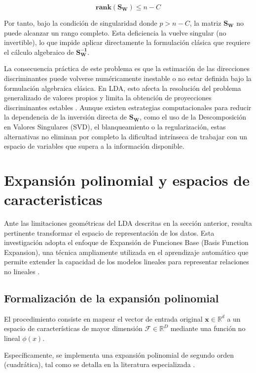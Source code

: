 \begin{equation}
	\mathbf{rank(S_W)}\leq n-C
	\label{eq:EMT11}
\end{equation}

Por tanto, bajo la condición de singularidad donde $p>n-C$, la matriz $\mathbf{S_W}$ no puede alcanzar un rango completo. Esta deficiencia la vuelve singular (no invertible), lo que impide aplicar directamente la formulación clásica que requiere el cálculo algebraico de $\mathbf{S_W^{-1}}$.

La consecuencia práctica de este problema es que la estimación de las direcciones discriminantes puede volverse numéricamente inestable o no estar definida bajo la formulación algebraica clásica. En LDA, esto afecta la resolución del problema generalizado de valores propios y limita la obtención de proyecciones discriminantes estables \cite{gao2006direct} \cite{martinez2001pca}. Aunque existen estrategias computacionales para reducir la dependencia de la inversión directa de $\mathbf{S_W}$, como el uso de la Descomposición en Valores Singulares (SVD), el blanqueamiento o la regularización, estas alternativas no eliminan por completo la dificultad intrínseca de trabajar con un espacio de variables que supera a la información disponible.

\section{Expansión polinomial y espacios de caracteristicas}

Ante las limitaciones geométricas del LDA descritas en la sección anterior, resulta pertinente transformar el espacio de representación de los datos. Esta investigación adopta el enfoque de Expansión de Funciones Base (Basis Function Expansion), una técnica ampliamente utilizada en el aprendizaje automático que permite extender la capacidad de los modelos lineales para representar relaciones no lineales \cite{bishop2006pattern}.

\subsection{Formalización de la expansión polinomial}

El procedimiento consiste en mapear el vector de entrada original $\mathbf{x} \in \mathbb{R}^d$ a un espacio de características de mayor dimensión $\mathcal{F} \in \mathbb{R}^D$ mediante una función no lineal $\phi(x)$.

Específicamente, se implementa una expansión polinomial de segundo orden (cuadrática), tal como se detalla en la literatura especializada \cite{kanade2016} \cite{niu2021local}.

